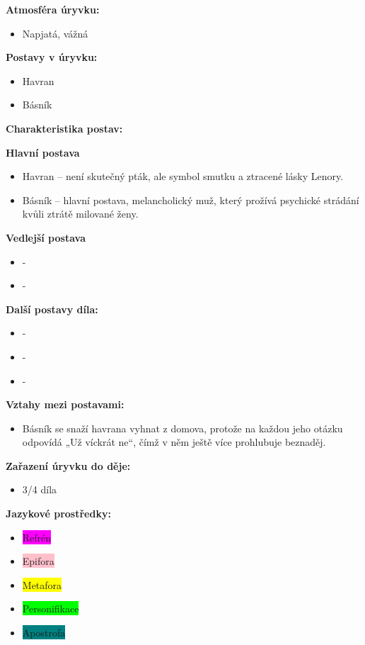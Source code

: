 \documentclass[12pt,a4paper]{article}
\begin{document}
\begin{tcolorbox}[breakable]

\textbf{Atmosféra úryvku:}
\begin{itemize}
\item Napjatá, vážná
\end{itemize}

\textbf{Postavy v úryvku:}
\begin{itemize}
\item Havran
\item Básník
\end{itemize}

\textbf{Charakteristika postav:}

\textbf{Hlavní postava}
\begin{itemize}
\item Havran – není skutečný pták, ale symbol smutku a ztracené lásky Lenory.
\item Básník – hlavní postava, melancholický muž, který prožívá psychické strádání kvůli ztrátě milované ženy.
\end{itemize}

\textbf{Vedlejší postava}
\begin{itemize}
\item -
\item -
\end{itemize}

\textbf{Další postavy díla:}

\begin{itemize}
\item -
\item -
\item -
\end{itemize}

\textbf{Vztahy mezi postavami:}
\begin{itemize}
\item Básník se snaží havrana vyhnat z domova, protože na každou jeho otázku odpovídá „Už víckrát ne“, čímž v něm ještě více prohlubuje beznaděj.
\end{itemize}

\textbf{Zařazení úryvku do děje:}
\begin{itemize}
\item 3/4 díla
\end{itemize}

\textbf{Jazykové prostředky:}
\begin{itemize}
\item \colorbox{magenta}{Refrén}
\item \colorbox{pink}{Epifora}
\item \colorbox{yellow}{Metafora}
\item \colorbox{lime}{Personifikace}
\item \colorbox{teal}{Apostrofa}
\end{itemize}

\end{tcolorbox}
\end{document}
